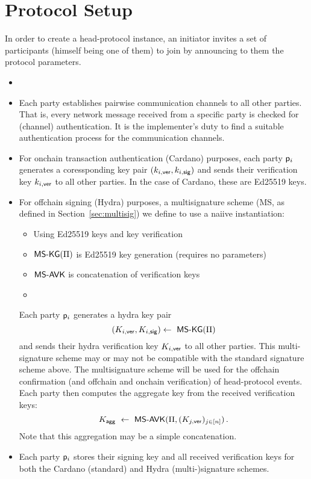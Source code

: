 
\section{Protocol Setup}\label{sec:setup}
In order to create a head-protocol instance, an initiator invites a set of
participants (himself being one of them) to join by announcing to them the
protocol parameters.

\begin{itemize}
  \item {}

  \item Each party establishes pairwise communication channels to all other parties. That is, every network message received from a specific party is checked for (channel) authentication. It is the implementer’s duty to find a suitable authentication process for the communication channels.

  \item For onchain transaction authentication (Cardano) purposes, each party $\mathsf p_i$ generates a
        coressponding key pair $(k_{i,\mathsf{ver}},k_{i,\mathsf{sig}})$ and sends their verification key $k_{i,\mathsf{ver}}$ to all other parties. In the case of Cardano, these are Ed25519 keys.

  \item For offchain signing (Hydra) purposes, a multisignature scheme (MS, as defined in Section~\ref{sec:multisig}) we define to use a naiive instantiation:
        \begin{itemize}
          \item Using Ed25519 keys and key verification
          \item $\mathsf{MS\textsf{-}{}KG}(\Pi)$ is Ed25519 key generation (requires no parameters)
          \item $\mathsf{MS\textsf{-}{}AVK}$ is concatenation of verification keys
          \item {}
        \end{itemize}
  
        Each party $\mathsf p_i$ generates a hydra key pair
        \[
          (K_{i,\mathsf{ver}},K_{i,\mathsf{sig}})  \gets \ \mathsf{MS\textsf{-}{}KG}(\Pi)
        \]
        and sends their hydra verification key $K_{i,\mathsf{ver}}$ to all other parties. This
        multi-signature scheme may or may not be compatible with the standard
        signature scheme above. The multisignature scheme will be used for the
        offchain confirmation (and offchain and onchain verification) of
        head-protocol events. Each party then computes the aggregate key from the received
        verification keys:
        \[
          \hpAK \ \gets \ \msCombVK(\msParams,(\daPuI{j})_{j\in[n]}) \,.
        \]
        Note that this aggregation may be a simple concatenation.

  \item Each party $\mathsf p_i$ stores their signing key and all received
        verification keys for both the Cardano (standard) and Hydra
        (multi-)signature schemes.
\end{itemize}

